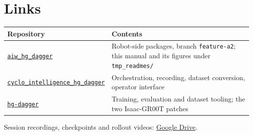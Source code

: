 \documentclass[11pt,a4paper]{article}
\begin{document}
\section{Links}
\label{sec:links}

\begin{center}
\small
\begin{tabular}{@{}lp{8.4cm}@{}}
\toprule
\textbf{Repository} & \textbf{Contents}\\
\midrule
\href{https://github.com/da-dawit/aiw_hg_dagger}{\texttt{aiw\_hg\_dagger}}
  & Robot-side packages, branch \texttt{feature-a2}; this manual and its figures under \texttt{tmp\_readmes/}\\
\href{https://github.com/da-dawit/cyclo_intelligence_hg_dagger}{\texttt{cyclo\_intelligence\_hg\_dagger}}
  & Orchestration, recording, dataset conversion, operator interface\\
\href{https://github.com/da-dawit/hg-dagger}{\texttt{hg-dagger}}
  & Training, evaluation and dataset tooling; the two Isaac-GR00T patches\\
\bottomrule
\end{tabular}
\end{center}

Session recordings, checkpoints and rollout videos:
\href{https://drive.google.com/drive/folders/15QwIDUiLEHWsbQtJYkK7RNKXCdkpzGy3?usp=sharing}{Google
Drive}.
\end{document}
